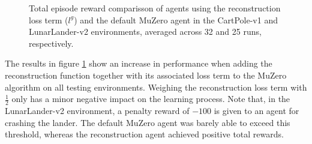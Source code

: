 \begin{figure}[ht]
    \caption{Total episode reward comparisson of agents using the reconstruction loss term ($l^g$) and the default MuZero agent in the CartPole-v1 and LunarLander-v2 environments, averaged across 32 and 25 runs, respectively.}
    \label{fig:reconstruction_results}
\end{figure}
The results in figure \ref{fig:reconstruction_results} show an increase in performance when adding the reconstruction function together with its associated loss term to the MuZero algorithm on all testing environments. Weighing the reconstruction loss term with $\frac{1}{2}$ only has a minor negative impact on the learning process. Note that, in the LunarLander-v2 environment, a penalty reward of $-100$ is given to an agent for crashing the lander. The default MuZero agent was barely able to exceed this threshold, whereas the reconstruction agent achieved positive total rewards.

